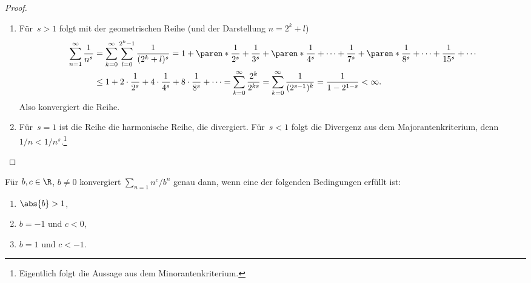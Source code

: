 \documentclass[a4paper]{article}
\begin{document}
\begin{proof}\leavevmode
    \begin{enumerate}
        \item Für~$s > 1$ folgt mit der geometrischen Reihe (und der Darstellung $n = 2^k + l$)
              \begin{align*}
                  \sum_{n=1}^\infty \frac{1}{n^s} & = \sum_{k=0}^\infty \sum_{l=0}^{2^k-1} \frac{1}{(2^k+l)^s} = 1 + \paren*{\frac{1}{2^s} + \frac{1}{3^s}} + \paren*{\frac{1}{4^s} + \dots + \frac{1}{7^s}} + \paren*{\frac{1}{8^s} + \dots + \frac{1}{15^s}} + \cdots \\
                                                  & \leq 1 + 2 \cdot \frac{1}{2^s} + 4 \cdot \frac{1}{4^s} + 8 \cdot \frac{1}{8^s} + \dots = \sum_{k=0}^\infty \frac{2^k}{2^{ks}} = \sum_{k=0}^\infty \frac{1}{(2^{s-1})^k} = \frac{1}{1-2^{1-s}} < \infty.
              \end{align*}
              Also konvergiert die Reihe.
        \item Für~$s = 1$ ist die Reihe die harmonische Reihe, die divergiert. Für~$s < 1$ folgt die Divergenz aus dem Majorantenkriterium, denn $1/n < 1/n^s$.\footnote{Eigentlich folgt die Aussage aus dem Minorantenkriterium.}\qedhere
    \end{enumerate}
\end{proof}


\begin{corollary}
    Für $b, c \in \R$, $b \neq 0$ konvergiert $\sum_{n=1} n^c/b^n$ genau dann, wenn eine der folgenden Bedingungen erfüllt ist:
    \begin{enumerate}
        \item $\abs{b} > 1$,
        \item $b = -1$ und $c < 0$,
        \item $b = 1$ und $c < -1$.
    \end{enumerate}
\end{corollary}
\end{document}
